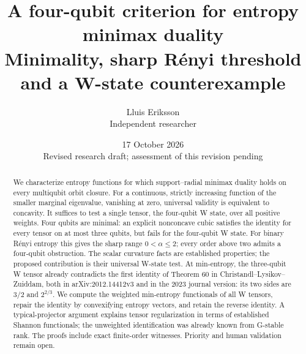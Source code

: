 \documentclass[11pt,a4paper]{article}
\title{A four-qubit criterion for entropy minimax duality\\
\large Minimality, sharp R\'enyi threshold and a W-state counterexample}
\author{Lluis Eriksson\\ \small Independent researcher}
\date{17 October 2026\\ \small Revised research draft; assessment of this revision pending}
\begin{document}
\maketitle
\begin{abstract}
We characterize entropy functions for which support--radial minimax
duality holds on every multiqubit orbit closure. For a continuous,
strictly increasing function of the smaller marginal eigenvalue,
vanishing at zero, universal validity is equivalent to concavity.
It suffices to test a single tensor, the four-qubit W state, over all
positive weights. Four qubits are minimal: an explicit nonconcave
cubic satisfies the identity for every tensor on at most three
qubits, but fails for the four-qubit W state. For binary R\'enyi entropy this gives the sharp
range \(0<\alpha\le2\); every order above two admits a four-qubit
obstruction. The scalar curvature facts are established properties;
the proposed contribution is their universal W-state test.
At min-entropy, the three-qubit W tensor already contradicts the first
identity of Theorem 60 in Christandl--Lysikov--Zuiddam,
both in arXiv:2012.14412v3 and in the 2023 journal version:
its two sides are \(3/2\) and \(2^{2/3}\).
We compute the weighted min-entropy functionals of all W tensors,
repair the identity by convexifying entropy vectors, and retain the
reverse identity. A typical-projector argument explains tensor
regularization in terms of established Shannon functionals; the
unweighted identification was already known from G-stable rank.
The proofs include exact finite-order witnesses. Priority and
human validation remain open.
\end{abstract}
\end{document}
